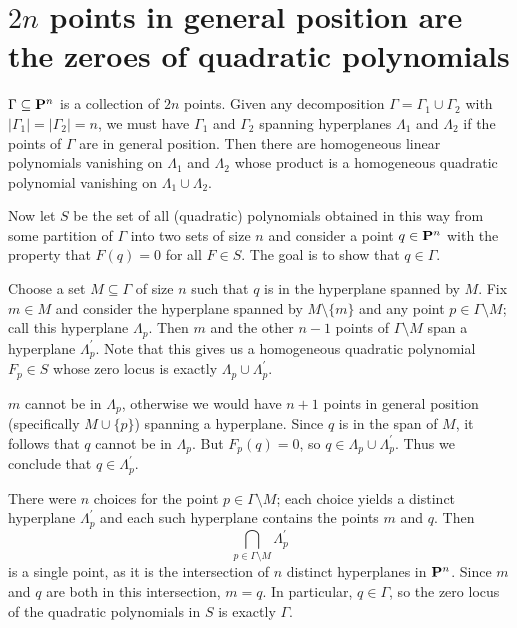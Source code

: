 

\section{$2n$ points in general position are the zeroes of quadratic polynomials}

$\Gamma\subseteq\P^n$ is a collection of $2n$ points. Given any decomposition $\Gamma=\Gamma_1\cup\Gamma_2$ with $|\Gamma_1|=|\Gamma_2|=n$, we must have $\Gamma_1$ and $\Gamma_2$ spanning hyperplanes $\Lambda_1$ and $\Lambda_2$ if the points of $\Gamma$ are in general position. Then there are homogeneous linear polynomials vanishing on $\Lambda_1$ and $\Lambda_2$ whose product is a homogeneous quadratic polynomial vanishing on $\Lambda_1\cup\Lambda_2$.

Now let $S$ be the set of all (quadratic) polynomials obtained in this way from some partition of $\Gamma$ into two sets of size $n$ and consider a point $q\in\P^n$ with the property that $F(q)=0$ for all $F\in S$. The goal is to show that $q\in\Gamma$.

Choose a set $M\subseteq\Gamma$ of size $n$ such that $q$ is in the hyperplane spanned by $M$. Fix $m\in M$ and consider the hyperplane spanned by $M\setminus\{m\}$ and any point $p\in\Gamma\setminus M$; call this hyperplane $\Lambda_p$. Then $m$ and the other $n-1$ points of $\Gamma\setminus M$ span a hyperplane $\Lambda_p^\prime$. Note that this gives us a homogeneous quadratic polynomial $F_p\in S$ whose zero locus is exactly $\Lambda_p\cup\Lambda_p^\prime$.

$m$ cannot be in $\Lambda_p$, otherwise we would have $n+1$ points in general position (specifically $M\cup\{p\}$) spanning a hyperplane. Since $q$ is in the span of $M$, it follows that $q$ cannot be in $\Lambda_p$. But $F_p(q)=0$, so $q\in \Lambda_p\cup\Lambda_p^\prime$. Thus we conclude that $q\in\Lambda_p^\prime$.

There were $n$ choices for the point $p\in\Gamma\setminus M$; each choice yields a distinct hyperplane $\Lambda_p^\prime$ and each such hyperplane contains the points $m$ and $q$. Then
$$
\bigcap_{p\in\Gamma\setminus M}\Lambda_p^\prime
$$
is a single point, as it is the intersection of $n$ distinct hyperplanes in $\P^n$. Since $m$ and $q$ are both in this intersection, $m=q$. In particular, $q\in\Gamma$, so the zero locus of the quadratic polynomials in $S$ is exactly $\Gamma$.


